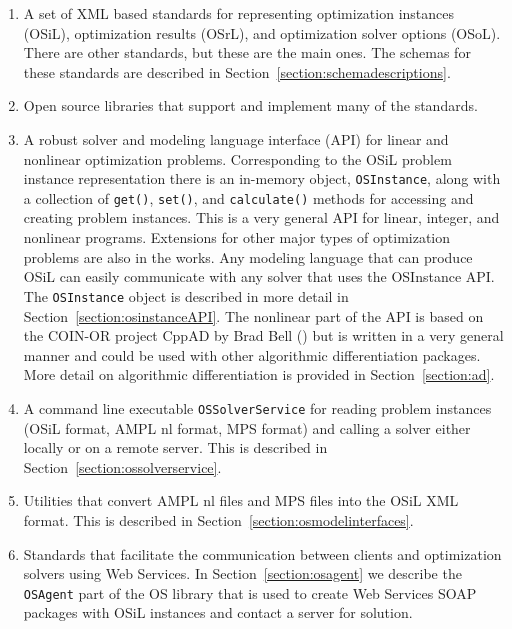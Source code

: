 \begin{enumerate}
\item{}  A set of XML based standards for representing optimization instances (OSiL), 
optimization results (OSrL), and optimization solver options (OSoL). 
There are other standards, but these are the main ones. 
The schemas for these standards are described in Section~\ref{section:schemadescriptions}.

\ifruncode\else
\item{}  Open source libraries  that support and implement many of the standards.

\item{}  A robust solver and modeling language interface (API) for linear and nonlinear optimization problems.
Corresponding to the OSiL problem instance representation there is an in-memory object,
{\tt OSInstance},
along with a collection of  {\tt get()},   {\tt set()}, and {\tt calculate()} methods for accessing and creating
problem instances. This is a very general API for linear, integer, and nonlinear programs.
Extensions for other major types of optimization problems are also in the works. Any modeling language that can
produce OSiL can easily communicate with any solver that uses the OSInstance API.   
The {\tt OSInstance} object
is described in more detail in Section~\ref{section:osinstanceAPI}. The nonlinear part of the API is based on the
COIN-OR project CppAD by Brad Bell ({\tt\UrlCppad}) but is written 
in a very general manner and could be used with other algorithmic differentiation packages. More detail on 
algorithmic differentiation is provided in Section~\ref{section:ad}.
\fi

\item{}  A  command line executable {\tt OSSolverService}  for reading
problem instances (OSiL format, AMPL  nl format,  
MPS format) and calling a solver either locally or on a remote server.
This is described in Section~\ref{section:ossolverservice}.

\ifruncode\else
\item{} Utilities that convert AMPL nl files  and MPS files into the OSiL XML format.
This is described in Section~\ref{section:osmodelinterfaces}.
\fi

\item{}  Standards that facilitate the communication between clients and optimization solvers using Web Services.
\ifruncode\else
In  Section~\ref{section:osagent} we describe the {\tt OSAgent} part of the OS library
that is used to create Web Services SOAP packages with OSiL instances and contact a server for 
solution.
\fi


\end{enumerate}
